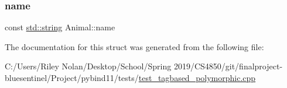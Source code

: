\subsubsection{\texorpdfstring{name}{name}}
{\footnotesize\ttfamily const \mbox{\hyperlink{_s_d_l__opengl__glext_8h_ab4ccfaa8ab0e1afaae94dc96ef52dde1}{std\+::string}} Animal\+::name}



The documentation for this struct was generated from the following file\+:\begin{DoxyCompactItemize}
\item 
C\+:/\+Users/\+Riley Nolan/\+Desktop/\+School/\+Spring 2019/\+C\+S4850/git/finalproject-\/bluesentinel/\+Project/pybind11/tests/\mbox{\hyperlink{test__tagbased__polymorphic_8cpp}{test\+\_\+tagbased\+\_\+polymorphic.\+cpp}}\end{DoxyCompactItemize}

